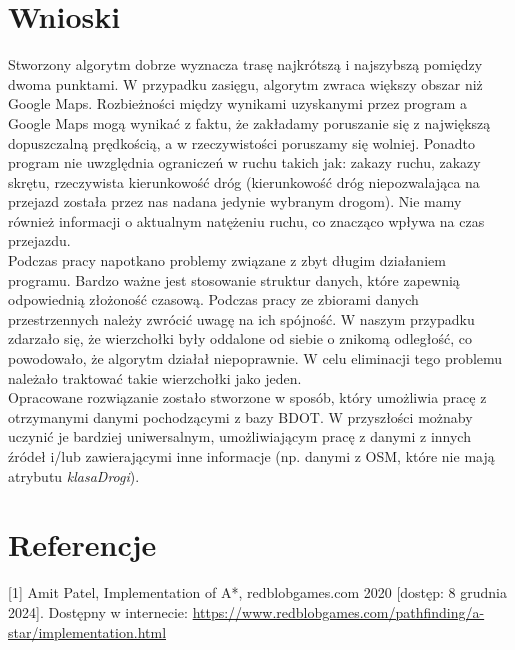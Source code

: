 \documentclass{article}
\begin{document}
\section{Wnioski}
Stworzony algorytm dobrze wyznacza trasę najkrótszą i najszybszą pomiędzy dwoma punktami. W przypadku zasięgu, algorytm zwraca większy obszar niż Google Maps.
Rozbieżności między wynikami uzyskanymi przez program a Google Maps mogą wynikać z faktu, że zakładamy poruszanie się z największą dopuszczalną prędkością, a w rzeczywistości poruszamy się wolniej.
Ponadto program nie uwzględnia ograniczeń w ruchu takich jak: zakazy ruchu, zakazy skrętu, rzeczywista kierunkowość dróg (kierunkowość dróg niepozwalająca na przejazd została przez 
nas nadana jedynie wybranym drogom). Nie mamy również informacji o aktualnym natężeniu ruchu, co znacząco wpływa na czas przejazdu.\\
Podczas pracy napotkano problemy związane z zbyt długim działaniem programu. Bardzo ważne jest stosowanie struktur danych, które zapewnią odpowiednią złożoność czasową. 
Podczas pracy ze zbiorami danych przestrzennych należy zwrócić uwagę na ich spójność. W naszym przypadku zdarzało się, że wierzchołki były oddalone od siebie o znikomą odległość, co powodowało, że
algorytm działał niepoprawnie. W celu eliminacji tego problemu należało traktować takie wierzchołki jako jeden.\\
Opracowane rozwiązanie zostało stworzone w sposób, który umożliwia pracę z otrzymanymi danymi pochodzącymi z bazy BDOT. W przyszłości 
możnaby uczynić je bardziej uniwersalnym, umożliwiającym pracę z danymi z innych źródeł i/lub zawierającymi inne informacje (np. danymi z OSM,
które nie mają atrybutu \textit{klasaDrogi}). 


\section{Referencje}
[1] Amit Patel, Implementation of A*, redblobgames.com 2020 [dostęp: 8 grudnia 2024]. Dostępny w internecie: \url{https://www.redblobgames.com/pathfinding/a-star/implementation.html}
\end{document}
